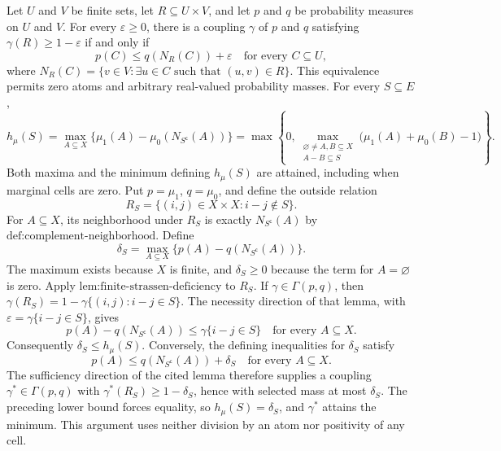 Let \(U\) and \(V\) be finite sets, let \(R\subseteq U\times V\), and let \(p\) and \(q\) be probability measures on \(U\) and \(V\).  For every \(\varepsilon\geq0\), there is a coupling \(\gamma\) of \(p\) and \(q\) satisfying \(\gamma(R)\geq1-\varepsilon\) if and only if
\[
p(C)\leq q(N_R(C))+\varepsilon
\quad\text{for every }C\subseteq U,
\]
where \(N_R(C)=\{v\in V:\exists u\in C\text{ such that }(u,v)\in R\}\).  This equivalence permits zero atoms and arbitrary real-valued probability masses.
For every \(S\subseteq E\),
\[
h_{\mu}(S)=\max_{A\subseteq X}\{\mu_1(A)-\mu_0(N_{S^{\mathsf c}}(A))\}=\max\!\left\{0,\max_{\substack{\varnothing\neq A,B\subseteq X\\A-B\subseteq S}}\bigl(\mu_1(A)+\mu_0(B)-1\bigr)\right\}.
\]
Both maxima and the minimum defining \(h_{\mu}(S)\) are attained, including when marginal cells are zero.
Put \(p=\mu_1\), \(q=\mu_0\), and define the outside relation
\[
R_S=\{(i,j)\in X\times X:i-j\notin S\}.
\]
For \(A\subseteq X\), its neighborhood under \(R_S\) is exactly \(N_{S^{\mathsf c}}(A)\) by \(\text{def:complement-neighborhood}\).  Define
\[
\delta_S=\max_{A\subseteq X}\{p(A)-q(N_{S^{\mathsf c}}(A))\}.
\]
The maximum exists because \(X\) is finite, and \(\delta_S\geq0\) because the term for \(A=\varnothing\) is zero.  Apply \(\text{lem:finite-strassen-deficiency}\) to \(R_S\).  If \(\gamma\in\Gamma(p,q)\), then \(\gamma(R_S)=1-\gamma\{(i,j):i-j\in S\}\).  The necessity direction of that lemma, with \(\varepsilon=\gamma\{i-j\in S\}\), gives
\[
p(A)-q(N_{S^{\mathsf c}}(A))\leq \gamma\{i-j\in S\}
\quad\text{for every }A\subseteq X.
\]
Consequently \(\delta_S\leq h_{\mu}(S)\).  Conversely, the defining inequalities for \(\delta_S\) satisfy
\[
p(A)\leq q(N_{S^{\mathsf c}}(A))+\delta_S
\quad\text{for every }A\subseteq X.
\]
The sufficiency direction of the cited lemma therefore supplies a coupling \(\gamma^*\in\Gamma(p,q)\) with \(\gamma^*(R_S)\geq1-\delta_S\), hence with selected mass at most \(\delta_S\).  The preceding lower bound forces equality, so \(h_{\mu}(S)=\delta_S\), and \(\gamma^*\) attains the minimum.  This argument uses neither division by an atom nor positivity of any cell.

